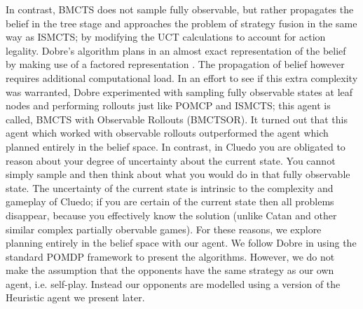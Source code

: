 \documentclass[msc, ai, logo, twoside, notimes, parskip, leftchapter, normalheadings]{infthesis}
\begin{document}
In contrast, BMCTS does not sample fully observable, but rather propagates the belief in the tree stage and approaches the problem of strategy fusion in the same way as ISMCTS; by modifying the UCT calculations to account for action legality. Dobre's algorithm plans in an almost exact representation of the belief by making use of a factored representation \citep{Mihai}. The propagation of belief however requires additional computational load. In an effort to see if this extra complexity was warranted, Dobre experimented with sampling fully observable states at leaf nodes and performing rollouts just like POMCP and ISMCTS; this agent is called, BMCTS with Observable Rollouts (BMCTSOR). It turned out that this agent which worked with observable rollouts outperformed the agent which planned entirely in the belief space. In contrast, in Cluedo you are obligated to reason about your degree of uncertainty about the current state. You cannot simply sample and then think about what you would do in that fully observable state. The uncertainty of the current state is intrinsic to the complexity and gameplay of Cluedo; if you are certain of the current state then all problems disappear, because you effectively know the solution (unlike Catan and other similar complex partially obervable games). For these reasons, we explore planning entirely in the belief space with our agent. We follow Dobre in using the standard POMDP framework to present the algorithms. However, we do not make the assumption that the opponents have the same strategy as our own agent, i.e. self-play. Instead our opponents are modelled using a version of the Heuristic agent we present later.
\end{document}
